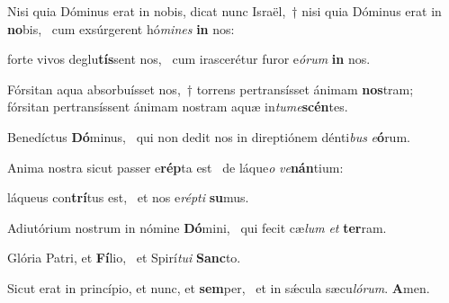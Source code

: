 \item Nisi quia Dóminus erat in nobis, dicat nunc Israël,~† nisi quia Dóminus erat in \textbf{no}bis,~\psstar{} cum exsúrgerent hó\textit{mines} \textbf{in} nos:

\item forte vivos deglu\textbf{tís}sent nos,~\psstar{} cum irascerétur furor e\textit{órum} \textbf{in} nos.

\item Fórsitan aqua absorbuísset nos,~† torrens pertransísset ánimam \textbf{nos}tram;~\psstar{} fórsitan pertransíssent ánimam nostram aquæ in\textit{tume}\textbf{scén}tes.

\item Benedíctus \textbf{Dó}minus,~\psstar{} qui non dedit nos in direptiónem dénti\textit{bus} \textit{e}\textbf{ó}rum.

\item Anima nostra sicut passer e\textbf{rép}ta est~\psstar{} de láque\textit{o} \textit{ve}\textbf{nán}tium:

\item láqueus con\textbf{trí}tus est,~\psstar{} et nos e\textit{répti} \textbf{su}mus.

\item Adiutórium nostrum in nómine \textbf{Dó}mini,~\psstar{} qui fecit cæ\textit{lum} \textit{et} \textbf{ter}ram.

\item Glória Patri, et \textbf{Fí}lio,~\psstar{} et Spirí\textit{tui} \textbf{Sanc}to.

\item Sicut erat in princípio, et nunc, et \textbf{sem}per,~\psstar{} et in sǽcula sæcu\textit{lórum}. \textbf{A}men.